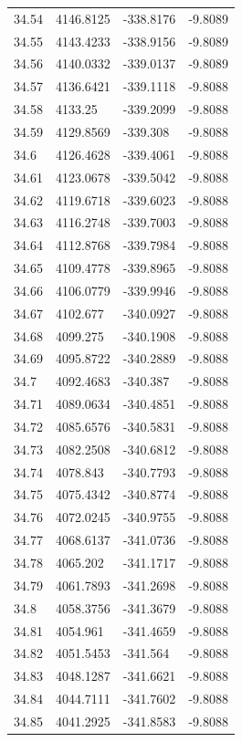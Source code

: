 \begin{table}[H]
\begin{tabular}{llll}
34.54 & 4146.8125 & -338.8176 & -9.8089 \\
34.55 & 4143.4233 & -338.9156 & -9.8089 \\
34.56 & 4140.0332 & -339.0137 & -9.8089 \\
34.57 & 4136.6421 & -339.1118 & -9.8088 \\
34.58 & 4133.25 & -339.2099 & -9.8088 \\
34.59 & 4129.8569 & -339.308 & -9.8088 \\
34.6 & 4126.4628 & -339.4061 & -9.8088 \\
34.61 & 4123.0678 & -339.5042 & -9.8088 \\
34.62 & 4119.6718 & -339.6023 & -9.8088 \\
34.63 & 4116.2748 & -339.7003 & -9.8088 \\
34.64 & 4112.8768 & -339.7984 & -9.8088 \\
34.65 & 4109.4778 & -339.8965 & -9.8088 \\
34.66 & 4106.0779 & -339.9946 & -9.8088 \\
34.67 & 4102.677 & -340.0927 & -9.8088 \\
34.68 & 4099.275 & -340.1908 & -9.8088 \\
34.69 & 4095.8722 & -340.2889 & -9.8088 \\
34.7 & 4092.4683 & -340.387 & -9.8088 \\
34.71 & 4089.0634 & -340.4851 & -9.8088 \\
34.72 & 4085.6576 & -340.5831 & -9.8088 \\
34.73 & 4082.2508 & -340.6812 & -9.8088 \\
34.74 & 4078.843 & -340.7793 & -9.8088 \\
34.75 & 4075.4342 & -340.8774 & -9.8088 \\
34.76 & 4072.0245 & -340.9755 & -9.8088 \\
34.77 & 4068.6137 & -341.0736 & -9.8088 \\
34.78 & 4065.202 & -341.1717 & -9.8088 \\
34.79 & 4061.7893 & -341.2698 & -9.8088 \\
34.8 & 4058.3756 & -341.3679 & -9.8088 \\
34.81 & 4054.961 & -341.4659 & -9.8088 \\
34.82 & 4051.5453 & -341.564 & -9.8088 \\
34.83 & 4048.1287 & -341.6621 & -9.8088 \\
34.84 & 4044.7111 & -341.7602 & -9.8088 \\
34.85 & 4041.2925 & -341.8583 & -9.8088 \\

\end{tabular}
\end{table}
